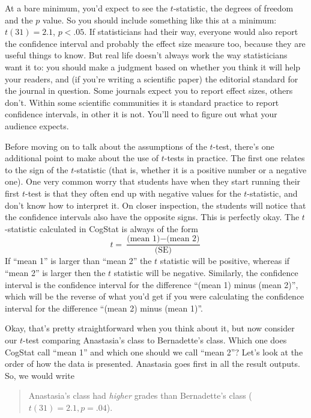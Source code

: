 \documentclass[
]{book}
\theoremstyle{definition}
\theoremstyle{definition}
\theoremstyle{definition}
\theoremstyle{definition}
\theoremstyle{remark}
\begin{document}
At a bare minimum, you'd expect to see the \(t\)-statistic, the degrees of freedom and the \(p\) value. So you should include something like this at a minimum: \(t(31) = 2.1\), \(p<.05\). If statisticians had their way, everyone would also report the confidence interval and probably the effect size measure too, because they are useful things to know. But real life doesn't always work the way statisticians want it to: you should make a judgment based on whether you think it will help your readers, and (if you're writing a scientific paper) the editorial standard for the journal in question. Some journals expect you to report effect sizes, others don't. Within some scientific communities it is standard practice to report confidence intervals, in other it is not. You'll need to figure out what your audience expects.

Before moving on to talk about the assumptions of the \(t\)-test, there's one additional point to make about the use of \(t\)-tests in practice. The first one relates to the sign of the \(t\)-statistic (that is, whether it is a positive number or a negative one). One very common worry that students have when they start running their first \(t\)-test is that they often end up with negative values for the \(t\)-statistic, and don't know how to interpret it. On closer inspection, the students will notice that the confidence intervals also have the opposite signs. This is perfectly okay. The \(t\)-statistic calculated in CogStat is always of the form
\[
t = \frac{\mbox{(mean 1)} -\mbox{(mean 2)}}{ \mbox{(SE)}}
\]
If ``mean 1'' is larger than ``mean 2'' the \(t\) statistic will be positive, whereas if ``mean 2'' is larger then the \(t\) statistic will be negative. Similarly, the confidence interval is the confidence interval for the difference ``(mean 1) minus (mean 2)'', which will be the reverse of what you'd get if you were calculating the confidence interval for the difference ``(mean 2) minus (mean 1)''.

Okay, that's pretty straightforward when you think about it, but now consider our \(t\)-test comparing Anastasia's class to Bernadette's class. Which one does CogStat call ``mean 1'' and which one should we call ``mean 2''? Let's look at the order of how the data is presented. Anastasia goes first in all the result outputs. So, we would write

\begin{quote}
Anastasia's class had \emph{higher} grades than Bernadette's class (\(t(31)= 2.1, p=.04\)).
\end{quote}
\end{document}
